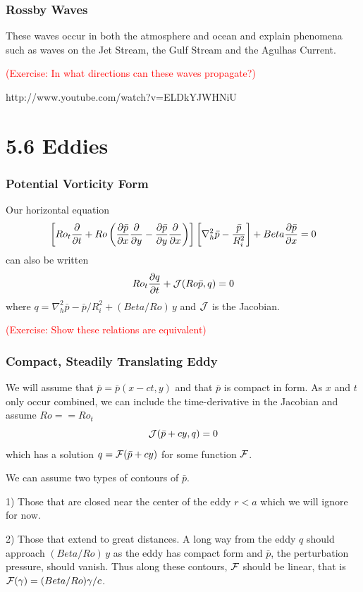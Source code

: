 \documentclass[xcolor=dvipsnames]{beamer}
\begin{document}
\begin{frame}
\frametitle{Rossby Waves}

These waves occur in both the atmosphere and ocean and explain phenomena such as waves on the Jet Stream, the Gulf Stream and the Agulhas Current.

\textcolor{red}{(Exercise: In what directions can these waves propagate?)}

http://www.youtube.com/watch?v=ELDkYJWHNiU
\end{frame}

\section{5.6 Eddies}

\begin{frame}
\frametitle{Potential Vorticity Form}

Our horizontal equation
\[
\left[ Ro_t \frac {\partial}{\partial t} + Ro \left(\frac{\partial \bar p}{\partial x} \frac {\partial}{\partial y} - \frac{\partial \bar p}{\partial y} \frac {\partial}{\partial x}\right)\right] \left[ \nabla_h^2 \bar p - \frac{\bar p}{R_i^2}\right] + Beta \frac{\partial \bar p}{\partial x} =0\]
can also be written
\[ Ro_t \frac{\partial q}{\partial t} + {\cal J}(Ro \bar{p}, q) = 0 \]
where $q = \nabla_h^2 \bar p - \bar p / R_i^2 + (Beta/Ro)\, y$ and ${\cal J}$ is the Jacobian.

\textcolor{red}{(Exercise: Show these relations are equivalent)}
\end{frame}
\begin{frame}
\frametitle{Compact, Steadily Translating Eddy}

We will assume that $\bar{p} = \bar{p}(x-ct,y)$ and that $\bar{p}$ is compact in form.  As $x$ and $t$ only occur combined, we can include the time-derivative in the Jacobian and assume $Ro == Ro_t$
\[ {\cal J}(\bar{p} + c y, q) = 0\]
which has a solution $q = {\cal F}(\bar{p} + cy)$ for some function ${\cal F}$.

We can assume two types of contours of $\bar{p}$.  

1) Those that are closed near the center of the eddy $r < a$ which we will ignore for now.
  
2) Those that extend to great distances.  A long way from the eddy $q$ should approach $(Beta/Ro)\, y$ as the eddy has compact form and $\bar p$, the perturbation pressure, should vanish.  Thus along these contours, ${\cal F}$ should be linear, that is ${\cal F}(\gamma) = (Beta/Ro) \gamma/c$. 

\end{frame}
\end{document}
